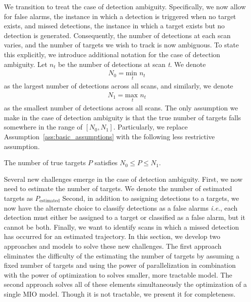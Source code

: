 We transition to treat the case of detection ambiguity. Specifically, we now allow for false alarms, the instance in which a detection is triggered when no target exists, and missed detections, the instance in which a target exists but no detection is generated. Consequently, the number of detections at each scan varies, and the number of targets we wish to track is now ambiguous. To state this explicitly, we introduce additional notation for the case of detection ambiguity. Let $n_{t}$ be the number of detections at scan \textit{t}. We denote 
\begin{align}
N_{0} = \underset{t}{\text{min }} n_{t}
\end{align}
as the largest number of detections across all scans, and similarly, we denote
\begin{align}
N_{1} = \underset{t}{\text{max }}  n_{t}
\end{align}
as the smallest number of detections across all scans. The only assumption we make in the case of detection ambiguity is that the true number of targets falls somewhere in the range of $[N_{0},N_{1}]$. Particularly, we replace Assumption~\ref{ass:basic_assumptions} with the following less restrictive assumption.
\begin{assumption}\label{ass:robust_assumptions}
\item The number of true targets $P$ satisfies $N_0\leq P \leq N_1$.
\end{assumption}

Several new challenges emerge in the case of detection ambiguity. First, we now need to estimate the number of targets. We denote the number of estimated targets as $P_{\text{estimated}}$ Second, in addition to assigning detections to a targets, we now have the alternate choice to classify detections as a false alarms \textit{i.e.}, each detection must either be assigned to a target or classified as a false alarm, but it cannot be both. Finally, we want to identify scans in which a missed detection has occurred for an estimated trajectory. In this section, we develop two approaches and models to solve these new challenges. The first approach eliminates the difficulty of the estimating the number of targets by assuming a fixed number of targets and using the power of parallelization in combination with the power of optimization to solves smaller, more tractable model. The second approach solves all of these elements simultaneously the optimization of a single MIO model. Though it is not tractable, we present it for completeness. 
 
